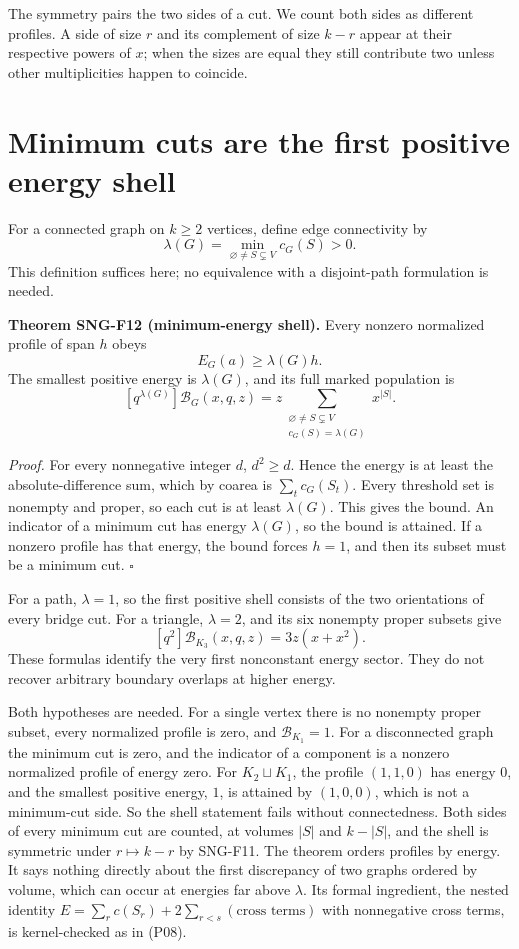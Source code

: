 \documentclass[
  11pt,
  a4paper,
]{report}
\let\singularitytexttt\texttt
\renewcommand{\texttt}[1]{\singularitytexttt{\seqsplit{#1}}}
\begin{document}
The symmetry pairs the two sides of a cut. We count both sides as
different profiles. A side of size \(r\) and its complement of size
\(k-r\) appear at their respective powers of \(x\); when the sizes are
equal they still contribute two unless other multiplicities happen to
coincide.

\hypertarget{minimum-cuts-are-the-first-positive-energy-shell}{%
\section{Minimum cuts are the first positive energy
shell}\label{minimum-cuts-are-the-first-positive-energy-shell}}

For a connected graph on \(k\ge2\) vertices, define edge connectivity by
\[
\lambda(G)=\min_{\varnothing\ne S\subsetneq V}c_G(S)>0.
\] This definition suffices here; no equivalence with a disjoint-path
formulation is needed.

\textbf{Theorem SNG-F12 (minimum-energy shell).} Every nonzero
normalized profile of span \(h\) obeys \[
E_G(a)\ge\lambda(G)h.
\] The smallest positive energy is \(\lambda(G)\), and its full marked
population is \[
[q^{\lambda(G)}]\mathcal B_G(x,q,z)
=z\sum_{\substack{\varnothing\ne S\subsetneq V\\c_G(S)=\lambda(G)}}x^{|S|}.
\]

\emph{Proof.} For every nonnegative integer \(d\), \(d^2\ge d\). Hence
the energy is at least the absolute-difference sum, which by coarea is
\(\sum_t c_G(S_t)\). Every threshold set is nonempty and proper, so each
cut is at least \(\lambda(G)\). This gives the bound. An indicator of a
minimum cut has energy \(\lambda(G)\), so the bound is attained. If a
nonzero profile has that energy, the bound forces \(h=1\), and then its
subset must be a minimum cut. \(\square\)

For a path, \(\lambda=1\), so the first positive shell consists of the
two orientations of every bridge cut. For a triangle, \(\lambda=2\), and
its six nonempty proper subsets give \[
[q^2]\mathcal B_{K_3}(x,q,z)=3z(x+x^2).
\] These formulas identify the very first nonconstant energy sector.
They do not recover arbitrary boundary overlaps at higher energy.

Both hypotheses are needed. For a single vertex there is no nonempty
proper subset, every normalized profile is zero, and
\(\mathcal B_{K_1}=1\). For a disconnected graph the minimum cut is
zero, and the indicator of a component is a nonzero normalized profile
of energy zero. For \(K_2\sqcup K_1\), the profile \((1,1,0)\) has
energy \(0\), and the smallest positive energy, \(1\), is attained by
\((1,0,0)\), which is not a minimum-cut side. So the shell statement
fails without connectedness. Both sides of every minimum cut are
counted, at volumes \(|S|\) and \(k-|S|\), and the shell is symmetric
under \(r\mapsto k-r\) by SNG-F11. The theorem orders profiles by
energy. It says nothing directly about the first discrepancy of two
graphs ordered by volume, which can occur at energies far above
\(\lambda\). Its formal ingredient, the nested identity
\(E=\sum_rc(S_r)+2\sum_{r<s}(\text{cross terms})\) with nonnegative
cross terms, is kernel-checked as \texttt{energy\_nested} in
\texttt{formal/Singularity/Thresholds.lean} (P08).
\end{document}
